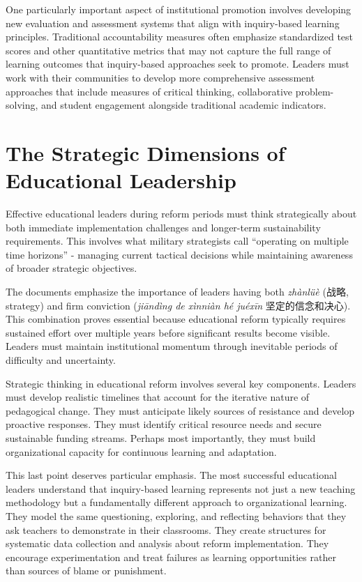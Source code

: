 \documentclass[
  Letterpaper,
]{scrbook}
\begin{document}
One particularly important aspect of institutional promotion involves
developing new evaluation and assessment systems that align with
inquiry-based learning principles. Traditional accountability measures
often emphasize standardized test scores and other quantitative metrics
that may not capture the full range of learning outcomes that
inquiry-based approaches seek to promote. Leaders must work with their
communities to develop more comprehensive assessment approaches that
include measures of critical thinking, collaborative problem-solving,
and student engagement alongside traditional academic indicators.

\section{The Strategic Dimensions of Educational
Leadership}\label{the-strategic-dimensions-of-educational-leadership}

Effective educational leaders during reform periods must think
strategically about both immediate implementation challenges and
longer-term sustainability requirements. This involves what military
strategists call ``operating on multiple time horizons'' - managing
current tactical decisions while maintaining awareness of broader
strategic objectives.

The documents emphasize the importance of leaders having both
\emph{zhànlüè} (战略, strategy) and firm conviction (\emph{jiāndìng de
xìnniàn hé juéxīn} 坚定的信念和决心). This combination proves essential
because educational reform typically requires sustained effort over
multiple years before significant results become visible. Leaders must
maintain institutional momentum through inevitable periods of difficulty
and uncertainty.

Strategic thinking in educational reform involves several key
components. Leaders must develop realistic timelines that account for
the iterative nature of pedagogical change. They must anticipate likely
sources of resistance and develop proactive responses. They must
identify critical resource needs and secure sustainable funding streams.
Perhaps most importantly, they must build organizational capacity for
continuous learning and adaptation.

This last point deserves particular emphasis. The most successful
educational leaders understand that inquiry-based learning represents
not just a new teaching methodology but a fundamentally different
approach to organizational learning. They model the same questioning,
exploring, and reflecting behaviors that they ask teachers to
demonstrate in their classrooms. They create structures for systematic
data collection and analysis about reform implementation. They encourage
experimentation and treat failures as learning opportunities rather than
sources of blame or punishment.
\end{document}
